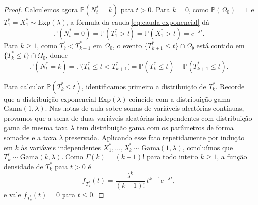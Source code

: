 \documentclass[12pt,portuguese]{article}
\theoremstyle{definition}
\theoremstyle{plainexercise}
\theoremstyle{starredexercise}
\theoremstyle{definition}
\begin{document}
\begin{proof}
Calculemos agora $\mathbb{P}(N_t^*=k)$ para $t>0$. Para $k=0$, como
$\mathbb{P}(\Omega_0)=1$ e $T_1^*=X_1^*\sim\mathrm{Exp}(\lambda)$, a fórmula da
cauda \eqref{eq:cauda-exponencial} dá
\[
  \mathbb{P}(N_t^*=0)=\mathbb{P}(T_1^*>t)=\mathbb{P}(X_1^*>t)=e^{-\lambda t}.
\]
Para $k\geqslant1$, como $T_k^*<T_{k+1}^*$ em $\Omega_0$, o evento
$\{T_{k+1}^*\leqslant t\}\cap\Omega_0$ está contido em
$\{T_k^*\leqslant t\}\cap\Omega_0$, donde
\begin{equation}\label{eq:prob-nt-diferenca-tk}
  \mathbb{P}(N_t^*=k)
  =\mathbb{P}\bigl(T_k^*\leqslant t<T_{k+1}^*\bigr)
  =\mathbb{P}(T_k^*\leqslant t)-\mathbb{P}(T_{k+1}^*\leqslant t).
\end{equation}

Para calcular $\mathbb{P}(T_k^*\leqslant t)$, identificamos primeiro a
distribuição de $T_k^*$. Recorde que a distribuição exponencial
$\mathrm{Exp}(\lambda)$ coincide com a distribuição gama $\mathrm{Gama}(1,\lambda)$.
Nas notas de aula sobre somas de variáveis aleatórias contínuas, provamos que a
soma de duas variáveis aleatórias independentes com distribuição gama de mesma
taxa $\lambda$ tem distribuição gama com os parâmetros de forma somados e a taxa
$\lambda$ preservada. Aplicando esse fato repetidamente por indução em $k$ às
variáveis independentes $X_1^*,\ldots,X_k^*\sim\mathrm{Gama}(1,\lambda)$,
concluímos que $T_k^*\sim\mathrm{Gama}(k,\lambda)$. Como $\Gamma(k)=(k-1)!$
para todo inteiro $k\geqslant1$, a função densidade de $T_k^*$ para $t>0$ é
\[
  f_{T_k^*}(t)=\frac{\lambda^k}{(k-1)!}\,t^{k-1}e^{-\lambda t},
\]
e vale $f_{T_k^*}(t)=0$ para $t\leqslant0$.


\end{proof}
\end{document}
